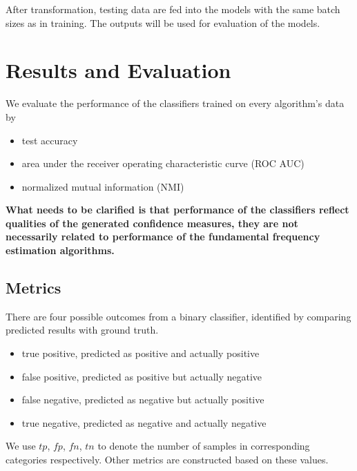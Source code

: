 \documentclass[11pt,a4paper,titlepage]{article}
\begin{document}
\bigskip

After transformation, testing data are fed into the models with the same batch sizes as in training.
The outputs will be used for evaluation of the models.

\newpage

\section{Results and Evaluation}

We evaluate the performance of the classifiers trained on every algorithm's data by

\begin{itemize}
  \item test accuracy
  \item area under the receiver operating characteristic curve (ROC AUC)
  \item normalized mutual information (NMI)
\end{itemize}

\begin{mdframed}
\textbf{What needs to be clarified is that performance of the classifiers reflect qualities of the generated confidence measures, they are not necessarily related to performance of the fundamental frequency estimation algorithms.}
\end{mdframed}

\subsection{Metrics}

There are four possible outcomes from a binary classifier, identified by comparing predicted results with ground truth.

\begin{itemize}
  \item true positive, predicted as positive and actually positive
  \item false positive, predicted as positive but actually negative
  \item false negative, predicted as negative but actually positive
  \item true negative, predicted as negative and actually negative
\end{itemize}

We use \(tp\), \(fp\), \(fn\), \(tn\) to denote the number of samples in corresponding categories respectively.
Other metrics are constructed based on these values.
\end{document}
